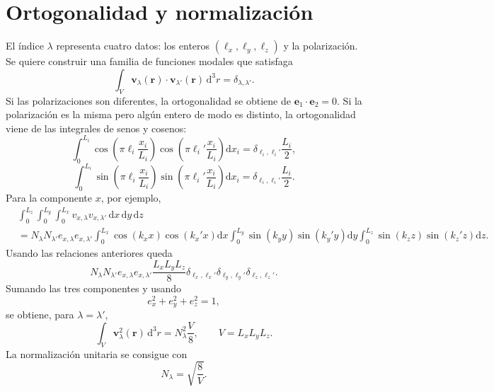 \documentclass[11pt]{article}
\newcommand{\dd}{\mathrm{d}}
\newcommand{\vb}[1]{\mathbf{#1}}
\begin{document}
\section{Ortogonalidad y normalizaci\'on}

El \'indice $\lambda$ representa cuatro datos: los enteros
$(\ell_x,\ell_y,\ell_z)$ y la polarizaci\'on. Se quiere construir una familia
de funciones modales que satisfaga
\begin{equation}
  \int_V \vb v_\lambda(\vb r)\cdot
  \vb v_{\lambda'}(\vb r)\,\dd^3r
  =
  \delta_{\lambda,\lambda'}.
\end{equation}
Si las polarizaciones son diferentes, la ortogonalidad se obtiene de
$\vb e_1\cdot\vb e_2=0$. Si la polarizaci\'on es la misma pero alg\'un entero
de modo es distinto, la ortogonalidad viene de las integrales de senos y
cosenos:
\begin{equation}
  \int_0^{L_i}
  \cos\left(\pi\ell_i\frac{x_i}{L_i}\right)
  \cos\left(\pi\ell_i'\frac{x_i}{L_i}\right)
  \dd x_i
  =
  \delta_{\ell_i,\ell_i'}\frac{L_i}{2},
\end{equation}
\begin{equation}
  \int_0^{L_i}
  \sin\left(\pi\ell_i\frac{x_i}{L_i}\right)
  \sin\left(\pi\ell_i'\frac{x_i}{L_i}\right)
  \dd x_i
  =
  \delta_{\ell_i,\ell_i'}\frac{L_i}{2}.
\end{equation}
Para la componente $x$, por ejemplo,
\begin{align}
  &\int_0^{L_z}\!\!\int_0^{L_y}\!\!\int_0^{L_x}
  v_{x,\lambda}v_{x,\lambda'}\,\dd x\,\dd y\,\dd z\\
  &=
  N_\lambda N_{\lambda'}
  e_{x,\lambda}e_{x,\lambda'}
  \int_0^{L_x}\cos(k_xx)\cos(k_x'x)\dd x
  \int_0^{L_y}\sin(k_yy)\sin(k_y'y)\dd y
  \int_0^{L_z}\sin(k_zz)\sin(k_z'z)\dd z.
\end{align}
Usando las relaciones anteriores queda
\begin{equation}
  N_\lambda N_{\lambda'}
  e_{x,\lambda}e_{x,\lambda'}
  \frac{L_xL_yL_z}{8}
  \delta_{\ell_x,\ell_x'}
  \delta_{\ell_y,\ell_y'}
  \delta_{\ell_z,\ell_z'}.
\end{equation}
Sumando las tres componentes y usando
\begin{equation}
  e_x^2+e_y^2+e_z^2=1,
\end{equation}
se obtiene, para $\lambda=\lambda'$,
\begin{equation}
  \int_V \vb v_\lambda^2(\vb r)\,\dd^3r
  =
  N_\lambda^2\frac{V}{8},
  \qquad
  V=L_xL_yL_z.
\end{equation}
La normalizaci\'on unitaria se consigue con
\begin{equation}
  N_\lambda=\sqrt{\frac{8}{V}}.
\end{equation}
\end{document}

